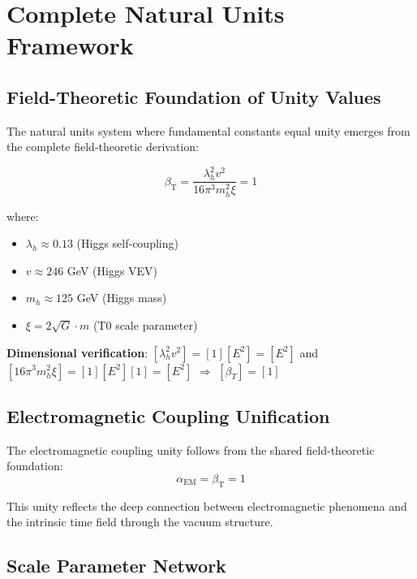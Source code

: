 \documentclass[12pt,a4paper]{article}
\begin{document}
	\section{Complete Natural Units Framework}
	\label{sec:complete_natural_units}
	
	\subsection{Field-Theoretic Foundation of Unity Values}
	\label{subsec:field_theoretic_foundation}
	
	The natural units system where fundamental constants equal unity emerges from the complete field-theoretic derivation:
	
	\begin{equation}
		\beta_{\text{T}} = \frac{\lambda_h^2 v^2}{16\pi^3 m_h^2 \xi} = 1
		\label{eq:beta_t_derivation}
	\end{equation}
	
	where:
	\begin{itemize}
		\item $\lambda_h \approx 0.13$ (Higgs self-coupling)
		\item $v \approx 246$ GeV (Higgs VEV)
		\item $m_h \approx 125$ GeV (Higgs mass)
		\item $\xi = 2\sqrt{G} \cdot m$ (T0 scale parameter)
	\end{itemize}
	
	\textbf{Dimensional verification}: $[\lambda_h^2 v^2] = [1][E^2] = [E^2]$ and $[16\pi^3 m_h^2 \xi] = [1][E^2][1] = [E^2]$ $\Rightarrow$ $[\beta_T] = [1]$ \checkmark
	
	\subsection{Electromagnetic Coupling Unification}
	\label{subsec:em_coupling_unification}
	
	The electromagnetic coupling unity follows from the shared field-theoretic foundation:
	\begin{equation}
		\alpha_{\text{EM}} = \beta_{\text{T}} = 1
		\label{eq:coupling_unity}
	\end{equation}
	
	This unity reflects the deep connection between electromagnetic phenomena and the intrinsic time field through the vacuum structure.
	
	\subsection{Scale Parameter Network}
	\label{subsec:scale_parameter_network}
	
\end{document}
